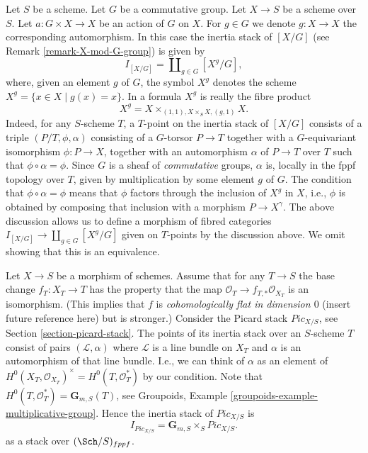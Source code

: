 \begin{example}
\label{example-inertia-stack-of-X-mod-G}
Let $S$ be a scheme. Let $G$ be a commutative group.
Let $X \to S$ be a scheme over $S$.
Let $a : G \times X \to X$ be an action of $G$ on $X$.
For $g \in G$ we denote $g : X \to X$ the corresponding automorphism.
In this case the inertia stack of $[X/G]$ (see
Remark \ref{remark-X-mod-G-group})
is given by
$$
I_{[X/G]} = \coprod\nolimits_{g\in G} [X^g/G],
$$
where, given an element $g$ of $G$, the symbol $X^g$ denotes the
scheme $X^g = \{x \in X \mid g(x) = x\}$. In a formula
$X^g$ is really the fibre
product
$$
X^g =  X \times_{(1, 1), X \times_S X, (g, 1)} X.
$$
Indeed, for any $S$-scheme $T$, a
$T$-point on the inertia stack of $[X/G]$ consists of a
triple $(P/T, \phi, \alpha)$ consisting of a $G$-torsor
$P\to T$ together with a $G$-equivariant isomorphism
$\phi : P \to X$, together
with an automorphism $\alpha$ of $P\to T$ over $T$ such that
$\phi \circ \alpha = \phi$.
Since $G$ is a sheaf of \emph{commutative} groups,
$\alpha$ is, locally in the fppf topology over $T$,
given by multiplication by some element $g$ of $G$.
The condition that $\phi \circ \alpha = \phi$ means that $\phi$
factors through the inclusion of $X^g$
in $X$, i.e., $\phi$ is obtained by composing that inclusion with a
morphism $P \to X^\gamma$.
The above discussion allows us to define a morphism of fibred categories
$I_{[X/G]} \to \coprod_{g\in G} [X^g/G]$ given on $T$-points by the discussion
above. We omit showing that this is an equivalence.
\end{example}

\begin{example}
\label{example-inertia-stack-of-picard}
Let $X\to S$ be a morphism of schemes.
Assume that for any $T \to S$ the base change $f_T : X_T \to T$
has the property that the map $\mathcal{O}_T \to f_{T, *}\mathcal{O}_{X_T}$
is an isomorphism. (This implies that $f$ is
{\it cohomologically flat in dimension $0$} (insert future reference here)
but is stronger.) Consider the Picard stack $\textit{Pic}_{X/S}$, see
Section \ref{section-picard-stack}.
The points of its inertia stack over an
$S$-scheme $T$ consist of pairs $(\mathcal{L}, \alpha)$
where $\mathcal{L}$ is a line bundle
on $X_T$ and $\alpha$ is an automorphism of that line bundle.
I.e., we can think of $\alpha$ as an element of
$H^0(X_T, \mathcal{O}_{X_T})^\times = H^0(T, \mathcal{O}_T^*)$
by our condition. Note that $H^0(T, \mathcal{O}_T^*) = \mathbf{G}_{m, S}(T)$,
see Groupoids, Example \ref{groupoids-example-multiplicative-group}.
Hence the inertia stack of $\textit{Pic}_{X/S}$ is
$$
I_{\textit{Pic}_{X/S}} = \mathbf{G}_{m, S} \times_S \textit{Pic}_{X/S}.
$$
as a stack over $(\Sch/S)_{fppf}$.
\end{example}






